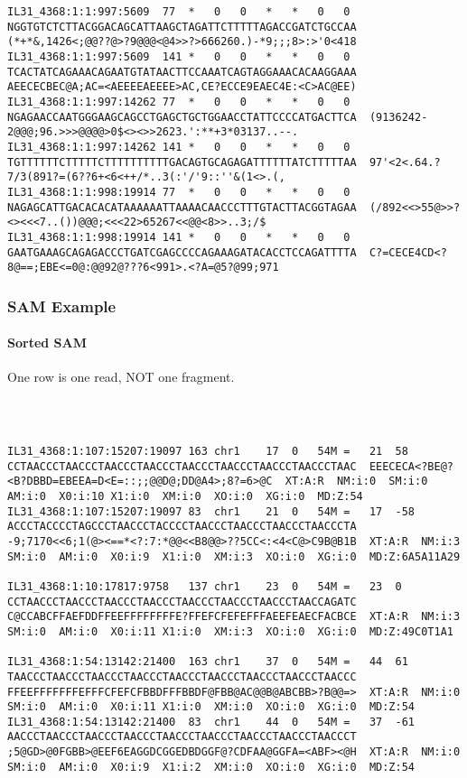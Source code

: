 \documentclass{beamer}
\begin{document}
\begin{frame}[fragile]
\begin{framed}
\begin{verbatim}
IL31_4368:1:1:997:5609	77	*	0	0	*	*	0	0	NGGTGTCTCTTACGGACAGCATTAAGCTAGATTCTTTTTAGACCGATCTGCCAA	(*+*&,1426<;@@??@>?9@@@<@4>>?>666260.)-*9;;;8>:>'0<418
IL31_4368:1:1:997:5609	141	*	0	0	*	*	0	0	TCACTATCAGAAACAGAATGTATAACTTCCAAATCAGTAGGAAACACAAGGAAA	AEECECBEC@A;AC=<AEEEEAEEEE>AC,CE?ECCE9EAEC4E:<C>AC@EE)
IL31_4368:1:1:997:14262	77	*	0	0	*	*	0	0	NGAGAACCAATGGGAAGCAGCCTGAGCTGCTGGAACCTATTCCCCATGACTTCA	(9136242-2@@@;96.>>>@@@@>0$<><>>2623.':**+3*03137..--.
IL31_4368:1:1:997:14262	141	*	0	0	*	*	0	0	TGTTTTTTCTTTTTCTTTTTTTTTTGACAGTGCAGAGATTTTTTATCTTTTTAA	97'<2<.64.?7/3(891?=(6??6+<6<++/*..3(:'/'9::''&(1<>.(,
IL31_4368:1:1:998:19914	77	*	0	0	*	*	0	0	NAGAGCATTGACACACATAAAAAATTAAAACAACCCTTTGTACTTACGGTAGAA	(/892<<>55@>>?<><<<7..())@@@;<<<22>65267<<@@<8>>..3;/$
IL31_4368:1:1:998:19914	141	*	0	0	*	*	0	0	GAATGAAAGCAGAGACCCTGATCGAGCCCCAGAAAGATACACCTCCAGATTTTA	C?=CECE4CD<?8@==;EBE<=0@:@@92@???6<991>.<?A=@5?@99;971
\end{verbatim}
\end{framed}
\end{frame}


\begin{frame}[fragile]
\frametitle{SAM Example}
\framesubtitle{Sorted SAM}
One row is one read, NOT one fragment.
\begin{framed}\tiny
\begin{verbatim}



IL31_4368:1:107:15207:19097	163	chr1	17	0	54M	=	21	58	CCTAACCCTAACCCTAACCCTAACCCTAACCCTAACCCTAACCCTAACCCTAAC	EEECECA<?BE@?<B?DBBD=EBEEA=D<E=::;;@@D@;DD@A4>;8?=6>@C	XT:A:R	NM:i:0	SM:i:0	AM:i:0	X0:i:10	X1:i:0	XM:i:0	XO:i:0	XG:i:0	MD:Z:54
IL31_4368:1:107:15207:19097	83	chr1	21	0	54M	=	17	-58	ACCCTACCCCTAGCCCTAACCCTACCCCTAACCCTAACCCTAACCCTAACCCTA	-9;7170<<6;1(@><==*<?:7:*@@<<B8@@>??5CC<:<4<C@>C9B@B1B	XT:A:R	NM:i:3	SM:i:0	AM:i:0	X0:i:9	X1:i:0	XM:i:3	XO:i:0	XG:i:0	MD:Z:6A5A11A29

IL31_4368:1:10:17817:9758	137	chr1	23	0	54M	=	23	0	CCTAACCCTAACCCTAACCCTAACCCTAACCCTAACCCTAACCCTAACCAGATC	C@CCABCFFAEFDDFFEEFFFFFFFFE?FFEFCFEFEFFFAEEFEAECFACBCE	XT:A:R	NM:i:3	SM:i:0	AM:i:0	X0:i:11	X1:i:0	XM:i:3	XO:i:0	XG:i:0	MD:Z:49C0T1A1

IL31_4368:1:54:13142:21400	163	chr1	37	0	54M	=	44	61	TAACCCTAACCCTAACCCTAACCCTAACCCTAACCCTAACCCTAACCCTAACCC	FFEEFFFFFFFEFFFCFEFCFBBDFFFBBDF@FBB@AC@@B@ABCBB>?B@@=>	XT:A:R	NM:i:0	SM:i:0	AM:i:0	X0:i:11	X1:i:0	XM:i:0	XO:i:0	XG:i:0	MD:Z:54
IL31_4368:1:54:13142:21400	83	chr1	44	0	54M	=	37	-61	AACCCTAACCCTAACCCTAACCCTAACCCTAACCCTAACCCTAACCCTAACCCT	;5@GD>@0FGBB>@EEF6EAGGDCGGEDBDGGF@?CDFAA@GGFA=<ABF><@H	XT:A:R	NM:i:0	SM:i:0	AM:i:0	X0:i:9	X1:i:2	XM:i:0	XO:i:0	XG:i:0	MD:Z:54


\end{verbatim}
\end{framed}
\end{frame}
\end{document}
